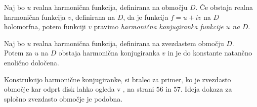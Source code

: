 \documentclass[mat1]{fmfdelo}
\begin{document}
    \begin{definicija}
        Naj bo $u$ realna harmonična funkcija, definirana na območju $D$. Če obstaja realna harmonična funkcija $v$, definirana na $D$, da je funkcija $f = u + iv$ na $D$ holomorfna, potem funkciji $v$ pravimo \emph{harmonična konjugiranka funkcije $u$ na $D$}.    
    \end{definicija}

    \begin{trditev}
        \label{konj}
        Naj bo $u$ realna harmonična funkcija, definirana na zvezdastem območju $D$. Potem za $u$ na $D$ obstaja harmonična konjugiranka $v$ in je do konstante natančno enolično določena. 
    \end{trditev}
    \begin{dokaz}
        Konstrukcijo harmonične konjugiranke, si bralec za primer, ko je zvezdasto območje kar odprt disk lahko ogleda v \cite{osnova}, na strani $56$ in $57$. 
        Ideja dokaza za splošno zvezdasto območje je podobna. 
    \end{dokaz}
\end{document}
